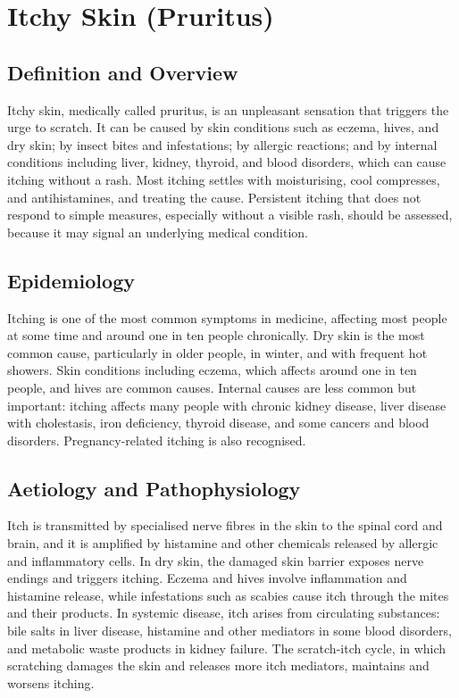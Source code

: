 \chapter{Itchy Skin (Pruritus)}

\section*{Definition and Overview}
Itchy skin, medically called pruritus, is an unpleasant sensation that triggers the urge to scratch. It can be caused by skin conditions such as eczema, hives, and dry skin; by insect bites and infestations; by allergic reactions; and by internal conditions including liver, kidney, thyroid, and blood disorders, which can cause itching without a rash. Most itching settles with moisturising, cool compresses, and antihistamines, and treating the cause. Persistent itching that does not respond to simple measures, especially without a visible rash, should be assessed, because it may signal an underlying medical condition.

\section*{Epidemiology}
Itching is one of the most common symptoms in medicine, affecting most people at some time and around one in ten people chronically. Dry skin is the most common cause, particularly in older people, in winter, and with frequent hot showers. Skin conditions including eczema, which affects around one in ten people, and hives are common causes. Internal causes are less common but important: itching affects many people with chronic kidney disease, liver disease with cholestasis, iron deficiency, thyroid disease, and some cancers and blood disorders. Pregnancy-related itching is also recognised.

\section*{Aetiology and Pathophysiology}
Itch is transmitted by specialised nerve fibres in the skin to the spinal cord and brain, and it is amplified by histamine and other chemicals released by allergic and inflammatory cells. In dry skin, the damaged skin barrier exposes nerve endings and triggers itching. Eczema and hives involve inflammation and histamine release, while infestations such as scabies cause itch through the mites and their products. In systemic disease, itch arises from circulating substances: bile salts in liver disease, histamine and other mediators in some blood disorders, and metabolic waste products in kidney failure. The scratch-itch cycle, in which scratching damages the skin and releases more itch mediators, maintains and worsens itching.

